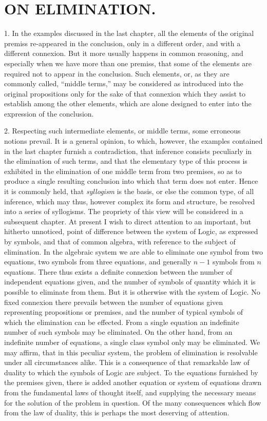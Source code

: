 \documentclass[oneside]{book}
\begin{document}
\chapter[OF ELIMINATION]
{\large ON ELIMINATION.}

1. In the examples discussed in the last chapter, all the elements
of the original premiss re-appeared in the conclusion,
only in a different order, and with a different connexion. But it
more usually happens in common reasoning, and especially when
we have more than one premiss, that some of the elements are
required not to appear in the conclusion. Such elements, or, as
they are commonly called, ``middle terms,'' may be considered
as introduced into the original propositions only for the sake of
that connexion which they assist to establish among the other
elements, which are alone designed to enter into the expression of
the conclusion.

2. Respecting such intermediate elements, or middle terms,
some erroneous notions prevail. It is a general opinion, to which,
however, the examples contained in the last chapter furnish a contradiction,
that inference consists peculiarly in the elimination of
such terms, and that the elementary type of this process is exhibited
in the elimination of one middle term from two premises, so as
to produce a single resulting conclusion into which that term does
not enter. Hence it is commonly held, that \textit{syllogism} is the basis,
or else the common type, of all inference, which may thus, however
complex its form and structure, be resolved into a series of
syllogisms. The propriety of this view will be considered in a
subsequent chapter. At present I wish to direct attention to an
important, but hitherto unnoticed, point of difference between
the system of Logic, as expressed by symbols, and that of common
algebra, with reference to the subject of elimination. In
the algebraic system we are able to eliminate one symbol from
two equations, two symbols from three equations, and generally
$n - 1$ symbols from $n$ equations. There thus exists a definite
connexion between the number of independent equations given,
and the number of symbols of quantity which it is possible to
eliminate from them. But it is otherwise with the system of
Logic. No fixed connexion there prevails between the number
of equations given representing propositions or premises,
and the number of typical symbols of which the elimination
can be effected. From a single equation an indefinite number
of such symbols may be eliminated. On the other hand,
from an indefinite number of equations, a single class symbol
only may be eliminated. We may affirm, that in this peculiar
system, the problem of elimination is resolvable under all circumstances
alike. This is a consequence of that remarkable law of
duality to which the symbols of Logic are subject. To the equations
furnished by the premises given, there is added another
equation or system of equations drawn from the fundamental
laws of thought itself, and supplying the necessary means for the
solution of the problem in question. Of the many consequences
which flow from the law of duality, this is perhaps the most
deserving of attention.
\end{document}
